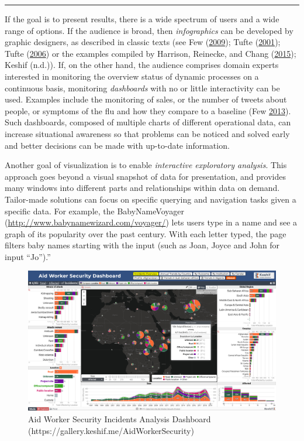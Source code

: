 \documentclass[]{krantz}
\begin{document}
\begin{center}\rule{0.5\linewidth}{\linethickness}\end{center}

If the goal is to present results, there is a wide spectrum of users and
a wide range of options. If the audience is broad, then
\emph{infographics} can be developed by graphic designers, as described
in classic texts (see Few (\protect\hyperlink{ref-few2009now}{2009});
Tufte (\protect\hyperlink{ref-edward2001visual}{2001}); Tufte
(\protect\hyperlink{ref-edward2006beauty}{2006}) or the examples
compiled by Harrison, Reinecke, and Chang
(\protect\hyperlink{ref-harrison2015infographic}{2015}); Keshif (n.d.)).
If, on the other hand, the audience comprises domain experts interested
in monitoring the overview status of dynamic processes on a continuous
basis, monitoring \emph{dashboards} with no or little interactivity can
be used. Examples include the monitoring of sales, or the number of
tweets about people, or symptoms of the flu and how they compare to a
baseline (Few \protect\hyperlink{ref-few2013information}{2013}). Such
dashboards, composed of multiple charts of different operational data,
can increase situational awareness so that problems can be noticed and
solved early and better decisions can be made with up-to-date
information.

Another goal of visualization is to enable \emph{interactive exploratory
analysis}. This approach goes beyond a visual snapshot of data for
presentation, and provides many windows into different parts and
relationships within data on demand. Tailor-made solutions can focus on
specific querying and navigation tasks given a specific data. For
example, the BabyNameVoyager
(\url{http://www.babynamewizard.com/voyager/}) lets users type in a name
and see a graph of its popularity over the past century. With each
letter typed, the page filters baby names starting with the input (such
as Joan, Joyce and John for input ``Jo'').''

\begin{figure}

{\centering \includegraphics[width=0.9\linewidth]{ChapterViz/figures/fig9-2a-new} 

}

\caption{Aid Worker Security Incidents Analysis Dashboard (https://gallery.keshif.me/AidWorkerSecurity)}\label{fig:fig9-2a}
\end{figure}
\end{document}
